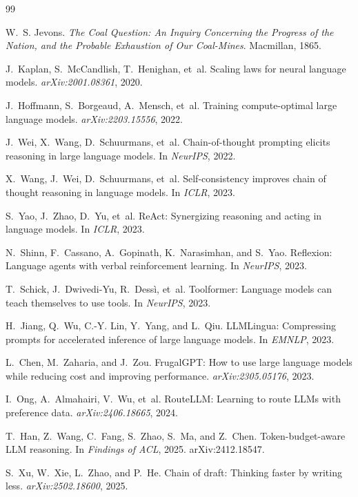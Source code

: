 \documentclass[11pt]{article}
\begin{document}
\begin{thebibliography}{99}\small

 W.~S. Jevons. \emph{The Coal Question: An Inquiry Concerning the Progress of the Nation, and the Probable Exhaustion of Our Coal-Mines}. Macmillan, 1865.

 J.~Kaplan, S.~McCandlish, T.~Henighan, et~al. Scaling laws for neural language models. \emph{arXiv:2001.08361}, 2020.

 J.~Hoffmann, S.~Borgeaud, A.~Mensch, et~al. Training compute-optimal large language models. \emph{arXiv:2203.15556}, 2022.

 J.~Wei, X.~Wang, D.~Schuurmans, et~al. Chain-of-thought prompting elicits reasoning in large language models. In \emph{NeurIPS}, 2022.

 X.~Wang, J.~Wei, D.~Schuurmans, et~al. Self-consistency improves chain of thought reasoning in language models. In \emph{ICLR}, 2023.

 S.~Yao, J.~Zhao, D.~Yu, et~al. ReAct: Synergizing reasoning and acting in language models. In \emph{ICLR}, 2023.

 N.~Shinn, F.~Cassano, A.~Gopinath, K.~Narasimhan, and S.~Yao. Reflexion: Language agents with verbal reinforcement learning. In \emph{NeurIPS}, 2023.

 T.~Schick, J.~Dwivedi-Yu, R.~Dess\`{i}, et~al. Toolformer: Language models can teach themselves to use tools. In \emph{NeurIPS}, 2023.

 H.~Jiang, Q.~Wu, C.-Y. Lin, Y.~Yang, and L.~Qiu. LLMLingua: Compressing prompts for accelerated inference of large language models. In \emph{EMNLP}, 2023.

 L.~Chen, M.~Zaharia, and J.~Zou. FrugalGPT: How to use large language models while reducing cost and improving performance. \emph{arXiv:2305.05176}, 2023.

 I.~Ong, A.~Almahairi, V.~Wu, et~al. RouteLLM: Learning to route LLMs with preference data. \emph{arXiv:2406.18665}, 2024.

 T.~Han, Z.~Wang, C.~Fang, S.~Zhao, S.~Ma, and Z.~Chen. Token-budget-aware LLM reasoning. In \emph{Findings of ACL}, 2025. arXiv:2412.18547.

 S.~Xu, W.~Xie, L.~Zhao, and P.~He. Chain of draft: Thinking faster by writing less. \emph{arXiv:2502.18600}, 2025.


\end{thebibliography}
\end{document}
